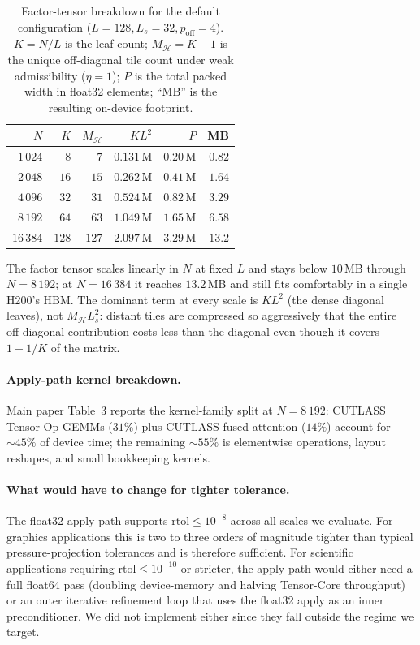 \documentclass[acmtog,anonymous,review]{acmart}
\begin{document}
\begin{table}[H]
\centering
\caption{Factor-tensor breakdown for the default configuration
($L\!=\!128, L_s\!=\!32, p_{\mathrm{off}}\!=\!4$). $K\!=\!N/L$ is the leaf
count; $M_{\mathcal{H}}\!=\!K\!-\!1$ is the unique off-diagonal tile count
under weak admissibility ($\eta\!=\!1$); $P$ is the total packed width in
float32 elements; ``MB'' is the resulting on-device footprint.}
\label{tab:supp_memory}
\footnotesize\setlength{\tabcolsep}{4pt}
\begin{tabular}{@{}r rrr rr@{}}
\toprule
$N$ & $K$ & $M_{\mathcal{H}}$ & $KL^2$ & $P$ & MB \\
\midrule
$1\,024$  & $8$            & $7$   & $0.131$\,M & $0.20$\,M & $0.82$ \\
$2\,048$  & $16$           & $15$  & $0.262$\,M & $0.41$\,M & $1.64$ \\
$4\,096$  & $32$           & $31$  & $0.524$\,M & $0.82$\,M & $3.29$ \\
$8\,192$  & $64$           & $63$  & $1.049$\,M & $1.65$\,M & $6.58$ \\
$16\,384$ & $128$          & $127$ & $2.097$\,M & $3.29$\,M & $13.2$ \\
\bottomrule
\end{tabular}
\end{table}

\noindent
The factor tensor scales linearly in $N$ at fixed $L$ and stays below
$10$\,MB through $N\!=\!8\,192$; at $N\!=\!16\,384$ it reaches
$13.2$\,MB and still fits comfortably in a single H200's HBM. The dominant term
at every scale is $KL^2$ (the dense diagonal
leaves), not $M_{\mathcal{H}} L_s^2$: distant tiles are compressed so
aggressively that the entire off-diagonal contribution costs less than the
diagonal even though it covers $1\!-\!1/K$ of the matrix.

\paragraph{Apply-path kernel breakdown.}
Main paper Table~3 reports the kernel-family split at $N\!=\!8\,192$: CUTLASS
Tensor-Op GEMMs ($31\%$) plus CUTLASS fused attention ($14\%$) account for
$\sim\!45\%$ of device time; the remaining $\sim\!55\%$ is elementwise
operations, layout reshapes, and small bookkeeping kernels.

\paragraph{What would have to change for tighter tolerance.}
The float32 apply path supports $\mathrm{rtol}\!\le\!10^{-8}$ across all scales
we evaluate. For graphics applications this is two to three orders of
magnitude tighter than typical pressure-projection tolerances and is therefore
sufficient. For scientific applications requiring $\mathrm{rtol}\!\le\!10^{-10}$
or stricter, the apply path would either need a full float64 pass (doubling
device-memory and halving Tensor-Core throughput) or an outer iterative
refinement loop that uses the float32 apply as an inner preconditioner. We did
not implement either since they fall outside the regime we target.
\end{document}

